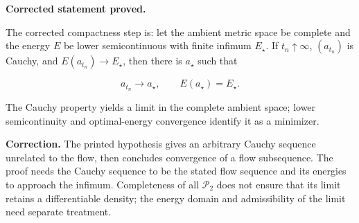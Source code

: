 \documentclass[11pt,a4paper]{report}
\begin{document}
\textbf{Corrected statement proved.}



The corrected compactness step is: let the
        ambient metric space be complete and the energy \(E\) be lower
        semicontinuous with finite infimum \(E_\star\). If
        \(t_n\uparrow\infty\), \((a_{t_n})\) is Cauchy, and
        \(E(a_{t_n})\to E_\star\), then there is \(a_\star\) such that


        \[a_{t_n}\longrightarrow a_\star,
          \qquad E(a_\star)=E_\star.\]


The Cauchy property yields a limit in the complete ambient space;
        lower semicontinuity and optimal-energy convergence identify it as a
        minimizer.



\textbf{Correction.} The printed hypothesis gives an arbitrary Cauchy sequence unrelated to the flow, then concludes convergence of a flow subsequence. The proof needs the Cauchy sequence to be the stated flow sequence and its energies to approach the infimum. Completeness of all \(\mathcal P_2\) does not ensure that its limit retains a differentiable density; the energy domain and admissibility of the limit need separate treatment.
\end{document}
